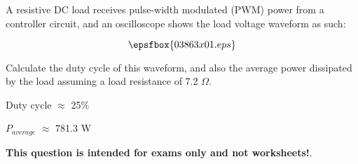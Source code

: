 

A resistive DC load receives pulse-width modulated (PWM) power from a controller circuit, and an oscilloscope shows the load voltage waveform as such:

$$\epsfbox{03863x01.eps}$$

Calculate the duty cycle of this waveform, and also the average power dissipated by the load assuming a load resistance of 7.2 $\Omega$.







Duty cycle $\approx$ 25\%

$P_{average}$ $\approx$ 781.3 W







{\bf This question is intended for exams only and not worksheets!}.



